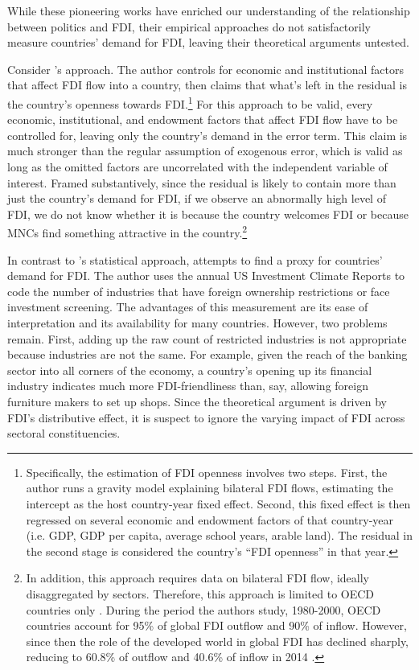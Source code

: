 While these pioneering works have enriched our understanding of the relationship
between politics and FDI, their empirical approaches do not satisfactorily
measure countries' demand for FDI, leaving their theoretical arguments untested.

Consider \citet{Pinto2013}'s approach. The author controls for economic and
institutional factors that affect FDI flow into a country, then claims that
what's left in the residual is the country's openness towards
FDI.\footnote{Specifically, the estimation of FDI openness involves two steps.
  First, the author runs a gravity model explaining bilateral FDI flows,
  estimating the intercept as the host country-year fixed effect. Second, this
  fixed effect is then regressed on several economic and endowment factors of
  that country-year (i.e. GDP, GDP per capita, average school years, arable
  land). The residual in the second stage is considered the country's ``FDI
  openness'' in that year.} For this approach to be valid, every economic,
institutional, and endowment factors that affect FDI flow have to be controlled
for, leaving only the country's demand in the error term. This claim is much
stronger than the regular assumption of exogenous error, which is valid as long
as the omitted factors are uncorrelated with the independent variable of
interest. Framed substantively, since the residual is likely to contain more
than just the country's demand for FDI, if we observe an abnormally high level
of FDI, we do not know whether it is because the country welcomes FDI or because
MNCs find something attractive in the country.\footnote{In addition, this
  approach requires data on bilateral FDI flow, ideally disaggregated by
  sectors. Therefore, this approach is limited to OECD countries only
  \citep{Pinto2008}. During the period the authors study, 1980-2000, OECD
  countries account for 95\% of global FDI outflow and 90\% of inflow. However,
  since then the role of the developed world in global FDI has declined sharply,
  reducing to 60.8\% of outflow and 40.6\% of inflow in 2014
  \citep{UNCTAD2015}.}

In contrast to \citet{Pinto2013}'s statistical approach, \citet{Pandya2014,
  Pandya2016} attempts to find a proxy for countries' demand for FDI. The author
uses the annual US Investment Climate Reports to code the number of industries
that have foreign ownership restrictions or face investment screening. The
advantages of this measurement are its ease of interpretation and its
availability for many countries. However, two problems remain. First, adding up
the raw count of restricted industries is not appropriate because industries are
not the same. For example, given the reach of the banking sector into all
corners of the economy, a country's opening up its financial industry indicates
much more FDI-friendliness than, say, allowing foreign furniture makers to set
up shops. Since the theoretical argument is driven by FDI's distributive effect,
it is suspect to ignore the varying impact of FDI across sectoral
constituencies.

